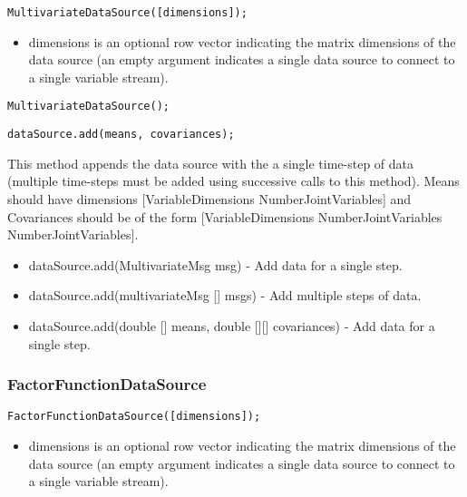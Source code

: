 
\ifmatlab
\begin{lstlisting}
MultivariateDataSource([dimensions]);
\end{lstlisting}

\begin{itemize}
\item dimensions is an optional row vector indicating the matrix dimensions of the data source (an empty argument indicates a single data source to connect to a single variable stream).
\end{itemize}
\fi

\ifjava
\begin{lstlisting}
MultivariateDataSource();
\end{lstlisting}
\fi



\ifmatlab
\begin{lstlisting}
dataSource.add(means, covariances);
\end{lstlisting}

This method appends the data source with the a single time-step of data (multiple time-steps must be added using successive calls to this method).  Means should have dimensions [VariableDimensions NumberJointVariables] and Covariances should be of the form [VariableDimensions NumberJointVariables NumberJointVariables].
\fi

\ifjava
\begin{itemize}
\item dataSource.add(MultivariateMsg msg) - Add data for a single step.
\item dataSource.add(multivariateMsg [] msgs) - Add multiple steps of data.
\item dataSource.add(double [] means, double [][] covariances) - Add data for a single step.
\end{itemize}
\fi


\subsubsection{FactorFunctionDataSource}


\ifmatlab
\begin{lstlisting}
FactorFunctionDataSource([dimensions]);
\end{lstlisting}

\begin{itemize}
\item dimensions is an optional row vector indicating the matrix dimensions of the data source (an empty argument indicates a single data source to connect to a single variable stream).
\end{itemize}
\fi

